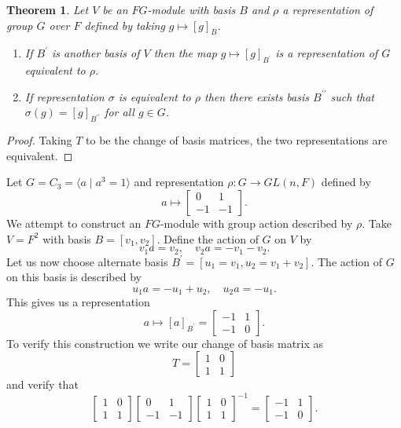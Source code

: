 \documentclass[11pt, notitlepage]{article}
\numberwithin{equation}{section}
\theoremstyle{plain}
\newtheorem{theorem}{Theorem}[section]
\theoremstyle{definition}
\newenvironment{example}
	{\pushQED{\qed}\renewcommand{\qedsymbol}{$\blacktriangleleft$}\examplex}
	{\popQED\endexamplex}
\begin{document}

\begin{theorem}
Let $V$ be an $FG$-module with basis $B$ and $\rho$ a representation of group $G$ over $F$ defined by taking $g \mapsto [g]_B$.
\begin{enumerate}[label=(\roman*)]
	\item If $B^\prime$ is another basis of $V$ then the map $g \mapsto [g]_{B^\prime}$ is a representation of $G$ equivalent to $\rho$.
	\item If representation $\sigma$ is equivalent to $\rho$ then there exists basis $B^{\prime\prime}$ such that $\sigma(g) = [g]_{B^{\prime\prime}}$ for all $g \in G$.
\end{enumerate}
\end{theorem}

\begin{proof}
Taking $T$ to be the change of basis matrices, the two representations are equivalent.
\end{proof}

\begin{example}
	Let $G = C_3 = \langle a \mid a^3 = 1 \rangle$ and representation $\rho: G \to GL(n,F)$ defined by
\[
	a \mapsto \begin{bmatrix} 0 & 1 \\ -1 & -1 \end{bmatrix}.
\]
	We attempt to construct an $FG$-module with group action described by $\rho$. Take $V = F^2$ with basis $B = [v_1, v_2]$. Define the action of $G$ on $V$ by
\[
	v_1 a = v_2, \quad v_2 a = -v_1 - v_2.
\]
	Let us now choose alternate basis $B^\prime = [u_1 = v_1, u_2 = v_1 + v_2]$. The action of $G$ on this basis is described by
\[
	u_1 a = -u_1 + u_2, \quad u_2 a = -u_1.
\]
This gives us a representation
\[
	a \mapsto [a]_{B^\prime} = \begin{bmatrix} -1 & 1\\ -1 & 0 \end{bmatrix}.
\]
To verify this construction we write our change of basis matrix as
\[
	T = \begin{bmatrix} 1 & 0\\ 1 & 1 \end{bmatrix}
\]
and verify that
\[
	\begin{bmatrix} 1 & 0\\ 1 & 1 \end{bmatrix}
	\begin{bmatrix} 0 & 1\\ -1 & -1 \end{bmatrix}
	\begin{bmatrix} 1 & 0\\ 1 & 1 \end{bmatrix}^{-1} = 
	\begin{bmatrix} -1 & 1\\ -1 & 0 \end{bmatrix}.
\]
\end{example}
\end{document}
